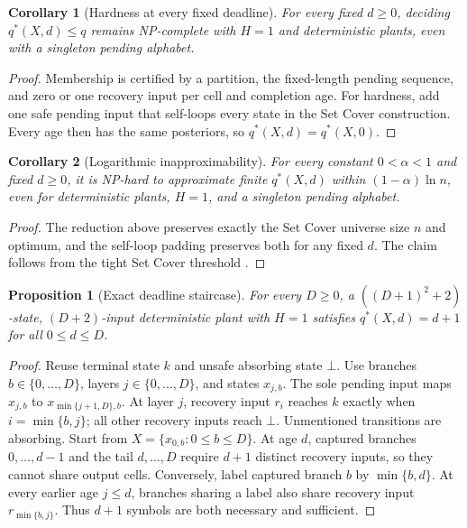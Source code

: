 \documentclass[letterpaper,10pt,conference]{ieeeconf}
\newtheorem{proposition}{Proposition}
\newtheorem{corollary}{Corollary}
\begin{document}
\begin{corollary}[Hardness at every fixed deadline]
For every fixed $d\ge0$, deciding $q^*(X,d)\le q$ remains NP-complete with $H=1$ and
deterministic plants, even with a singleton pending alphabet.
\end{corollary}
\begin{proof}
Membership is certified by a partition, the fixed-length pending sequence, and zero or one recovery input
per cell and completion age. For hardness, add one safe pending input that self-loops every state in
the Set Cover construction. Every age then has the same posteriors, so
$q^*(X,d)=q^*(X,0)$.
\end{proof}

\begin{corollary}[Logarithmic inapproximability]\label{cor:inapprox}
For every constant $0<\alpha<1$ and fixed $d\ge0$, it is NP-hard to approximate finite
$q^*(X,d)$ within $(1-\alpha)\ln n$, even for deterministic plants, $H=1$, and a singleton
pending alphabet.
\end{corollary}
\begin{proof}
The reduction above preserves exactly the Set Cover universe size $n$ and optimum, and the
self-loop padding preserves both for any fixed $d$. The claim follows from the tight Set Cover
threshold \cite{dinur2014}.
\end{proof}

\begin{proposition}[Exact deadline staircase]
For every \mbox{$D\ge0$}, a $((D+1)^2+2)$-state, $(D+2)$-input deterministic plant with $H=1$ satisfies
$q^*(X,d)=d+1$ for all $0\le d\le D$.
\end{proposition}
\begin{proof}
Reuse terminal state $k$ and unsafe absorbing state $\bot$. Use branches
$b\in\{0,\ldots,D\}$, layers $j\in\{0,\ldots,D\}$, and states $x_{j,b}$. The sole pending input
maps $x_{j,b}$ to $x_{\min\{j+1,D\},b}$. At layer $j$, recovery input $r_i$ reaches $k$ exactly
when $i=\min\{b,j\}$; all other recovery inputs reach $\bot$. Unmentioned transitions are
absorbing. Start from
$X=\{x_{0,b}:0\le b\le D\}$. At age $d$, captured branches
$0,\ldots,d-1$ and the tail $d,\ldots,D$ require $d+1$ distinct recovery inputs, so they cannot
share output cells. Conversely, label captured branch $b$ by $\min\{b,d\}$. At every earlier age
$j\le d$, branches sharing a label also share recovery input $r_{\min\{b,j\}}$. Thus $d+1$
symbols are both necessary and sufficient.
\end{proof}
\end{document}
